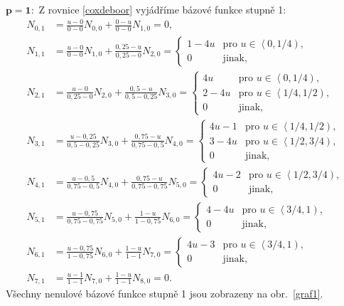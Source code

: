 \begin{priklad}
	$\mathbf{p=1}:$
	Z rovnice \eqref{coxdeboor} vyjádříme bázové funkce stupně 1:
	\begin{align*}
		N_{0,1}&=\frac{u-0}{0-0}N_{0,0}+\frac{0-u}{0-0}N_{1,0}=0,\\
		N_{1,1}&=\frac{u-0}{0-0}N_{1,0}+\frac{0,25-u}{0,25-0}N_{2,0}=
		\begin{cases}
			1-4u & \text{pro $u\in\left\langle 0,1/4 \right)$,} \\
			0 & \text{jinak,}
		\end{cases}\\
		N_{2,1}&=\frac{u-0}{0,25-0}N_{2,0}+\frac{0,5-u}{0,5-0,25}N_{3,0}=
		\begin{cases}
			4u & \text{pro $u\in\left\langle 0,1/4 \right)$,}\\
			2-4u & \text{pro $u\in\left\langle 1/4,1/2 \right)$,}\\
			0 & \text{jinak,}
		\end{cases}\\
		N_{3,1}&=\frac{u-0,25}{0,5-0,25}N_{3,0}+\frac{0,75-u}{0,75-0,5}N_{4,0}=
		\begin{cases}
			4u-1 & \text{pro $u\in\left\langle 1/4,1/2 \right)$,}\\
			3-4u & \text{pro $u\in\left\langle 1/2,3/4 \right)$,}\\
			0 & \text{jinak,}
		\end{cases}\\
		N_{4,1}&=\frac{u-0,5}{0,75-0,5}N_{4,0}+\frac{0,75-u}{0,75-0,75}N_{5,0}=
		\begin{cases}
		4u-2 & \text{pro $u\in\left\langle 1/2,3/4 \right)$,}\\
		0 & \text{jinak,}
		\end{cases}\\
		N_{5,1}&=\frac{u-0,75}{0,75-0,75}N_{5,0}+\frac{1-u}{1-0,75}N_{6,0}=
		\begin{cases}
		4-4u & \text{pro $u\in\left\langle 3/4,1 \right)$,}\\
		0 & \text{jinak,}
		\end{cases}\\
		N_{6,1}&=\frac{u-0,75}{1-0,75}N_{6,0}+\frac{1-u}{1-1}N_{7,0}=
		\begin{cases}
		4u-3 & \text{pro $u\in\left\langle 3/4,1 \right)$,}\\
		0 & \text{jinak,}
		\end{cases}\\
		N_{7,1}&=\frac{u-1}{1-1}N_{7,0}+\frac{1-u}{1-1}N_{8,0}=0.
	\end{align*}
	Všechny nenulové bázové funkce stupně 1 jsou zobrazeny na obr.~\ref{graf1}.

\end{priklad}
